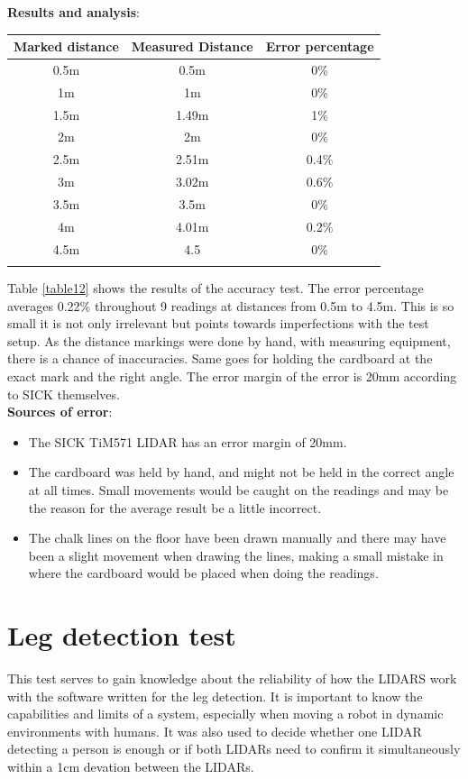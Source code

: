 \textbf{Results and analysis}:
\begin{center}
 \begin{tabular}{||c c c||} 
 \hline
 Marked distance & Measured Distance & Error percentage \\ [0.5ex] 
 \hline\hline
 0.5m & 0.5m & 0\%\\ 
 \hline
 1m & 1m & 0\%\\
 \hline
 1.5m & 1.49m & 1\%\\
 \hline
 2m & 2m & 0\%\\
 \hline
 2.5m & 2.51m & 0.4\%\\
 \hline
 3m & 3.02m & 0.6\%\\
 \hline
 3.5m & 3.5m & 0\%\\
 \hline
 4m & 4.01m & 0.2\%\\
 \hline
 4.5m & 4.5 & 0\%\\ [1ex] 
 \hline
 \label{table12}
\end{tabular}
\end{center}
Table \ref{table12} shows the results of the accuracy test. The error percentage averages 0.22\% throughout 9 readings at distances from 0.5m to 4.5m. This is so small it is not only irrelevant but points towards imperfections with the test setup. As the distance markings were done by hand, with measuring equipment, there is a chance of inaccuracies. Same goes for holding the cardboard at the exact mark and the right angle. The error margin of the error is 20mm according to SICK themselves.\\ %

\textbf{Sources of error}:
\begin{itemize}
    \item The SICK TiM571 LIDAR has an error margin of 20mm.\cite{timerrormargin}
    \item The cardboard was held by hand, and might not be held in the correct angle at all times. Small movements would be caught on the readings and may be the reason for the average result be a little incorrect.
    \item The chalk lines on the floor have been drawn manually and there may have been a slight movement when drawing the lines, making a small mistake in where the cardboard would be placed when doing the readings.
\end{itemize}

\section{Leg detection test}
This test serves to gain knowledge about the reliability of how the LIDARS work with the software written for the leg detection. It is important to know the capabilities and limits of a system, especially when moving a robot in dynamic environments with humans. It was also used to decide whether one LIDAR detecting a person is enough or if both LIDARs need to confirm it simultaneously within a 1cm devation between the LIDARs.\\


